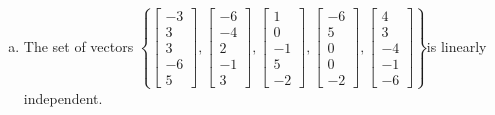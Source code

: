 \begin{exerciseAnswer}
\begin{enumerate}[(a)]
\item  The set of vectors \( \left\{ \left[\begin{array}{c}
-3 \\
3 \\
3 \\
-6 \\
5
\end{array}\right] , \left[\begin{array}{c}
-6 \\
-4 \\
2 \\
-1 \\
3
\end{array}\right] , \left[\begin{array}{c}
1 \\
0 \\
-1 \\
5 \\
-2
\end{array}\right] , \left[\begin{array}{c}
-6 \\
5 \\
0 \\
0 \\
-2
\end{array}\right] , \left[\begin{array}{c}
4 \\
3 \\
-4 \\
-1 \\
-6
\end{array}\right] \right\} \)is linearly independent.
\end{enumerate}
    
\end{exerciseAnswer}
    
